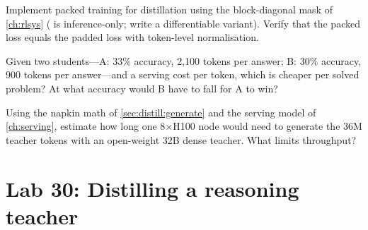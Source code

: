 \begin{exercise}
Implement packed training for distillation using the block-diagonal mask of \cref{ch:rlsys}
( is inference-only; write a differentiable variant). Verify that the packed
loss equals the padded loss with token-level normalisation.
\end{exercise}

\begin{exercise}
Given two students---A: 33\% accuracy, 2{,}100 tokens per answer; B: 30\% accuracy, 900 tokens per
answer---and a serving cost per token, which is cheaper per solved problem? At what accuracy would
B have to fall for A to win?
\end{exercise}

\begin{exercise}
Using the napkin math of \cref{sec:distill:generate} and the serving model of \cref{ch:serving},
estimate how long one 8$\times$H100 node would need to generate the 36M teacher tokens with an
open-weight 32B dense teacher. What limits throughput?
\end{exercise}

\section{Lab 30: Distilling a reasoning teacher}\label{sec:distill:lab}

